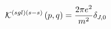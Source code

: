 \begin{equation}
\mathcal{K}^{\left( sgl\right) \left( s-s\right) }\left( p,q\right) =\frac{%
2\pi e^{2}}{m^{2}}\delta _{J,0}
\end{equation}

